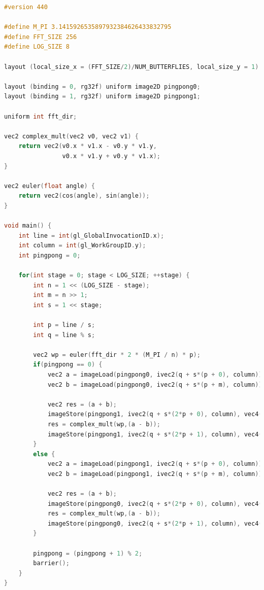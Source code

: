\documentclass[
  oneside,
  11pt, a4paper,
  footinclude=true,
  headinclude=true,
  cleardoublepage=empty
]{scrbook}
\begin{document}
\begin{lstlisting}[language=C, caption={FFT Radix-2 Stockham Horizontal unique pass, see \autoref{subsec:radix2-stockham}}, label={lst:glsl-radix2-stockham-horizontal}]
#version 440

#define M_PI 3.1415926535897932384626433832795
#define FFT_SIZE 256
#define LOG_SIZE 8

layout (local_size_x = (FFT_SIZE/2)/NUM_BUTTERFLIES, local_size_y = 1) in;

layout (binding = 0, rg32f) uniform image2D pingpong0;
layout (binding = 1, rg32f) uniform image2D pingpong1;

uniform int fft_dir;

vec2 complex_mult(vec2 v0, vec2 v1) {
    return vec2(v0.x * v1.x - v0.y * v1.y,
                v0.x * v1.y + v0.y * v1.x);
}

vec2 euler(float angle) {
    return vec2(cos(angle), sin(angle));
}

void main() {
    int line = int(gl_GlobalInvocationID.x);
    int column = int(gl_WorkGroupID.y);
    int pingpong = 0;

    for(int stage = 0; stage < LOG_SIZE; ++stage) {
        int n = 1 << (LOG_SIZE - stage);
        int m = n >> 1;
        int s = 1 << stage;

        int p = line / s;
        int q = line % s;
            
        vec2 wp = euler(fft_dir * 2 * (M_PI / n) * p);
        if(pingpong == 0) {
            vec2 a = imageLoad(pingpong0, ivec2(q + s*(p + 0), column)).rg;
            vec2 b = imageLoad(pingpong0, ivec2(q + s*(p + m), column)).rg;

            vec2 res = (a + b);
            imageStore(pingpong1, ivec2(q + s*(2*p + 0), column), vec4(res,0,0));
            res = complex_mult(wp,(a - b));
            imageStore(pingpong1, ivec2(q + s*(2*p + 1), column), vec4(res,0,0));
        }
        else {
            vec2 a = imageLoad(pingpong1, ivec2(q + s*(p + 0), column)).rg;
            vec2 b = imageLoad(pingpong1, ivec2(q + s*(p + m), column)).rg;

            vec2 res = (a + b);
            imageStore(pingpong0, ivec2(q + s*(2*p + 0), column), vec4(res,0,0));
            res = complex_mult(wp,(a - b));
            imageStore(pingpong0, ivec2(q + s*(2*p + 1), column), vec4(res,0,0));
        }
        
        pingpong = (pingpong + 1) % 2;
        barrier();
    }
}
\end{lstlisting}
\end{document}
